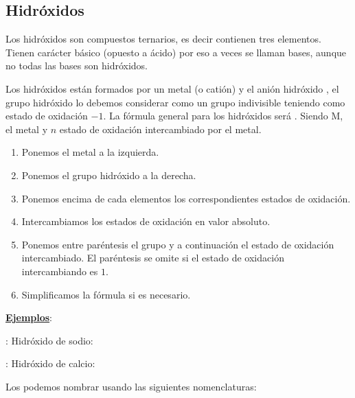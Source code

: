 \documentclass[12pt]{article}
\begin{document}
\subsection{Hidróxidos}

Los hidróxidos son compuestos ternarios, es decir contienen tres elementos. Tienen carácter básico (opuesto a ácido) por eso a veces se llaman bases, aunque no todas las bases son hidróxidos.

Los hidróxidos están formados por un metal (o catión) y el anión hidróxido , el grupo hidróxido lo debemos considerar como un grupo indivisible teniendo como estado de oxidación $-1$. La fórmula general para los hidróxidos será . Siendo M, el metal y $n$ estado de oxidación intercambiado por el metal.

\vspace*{2mm}

\begin{enumerate}[label=\itembolascolor{\arabic*}{mygreen}]
    \item Ponemos el metal a la izquierda.
    \item Ponemos el grupo hidróxido  a la derecha.
    \item Ponemos encima de cada elementos los correspondientes estados de oxidación.
    \item Intercambiamos los estados de oxidación en valor absoluto.
    \item Ponemos entre paréntesis el grupo  y a continuación el estado de oxidación intercambiado. El paréntesis se omite si el estado de oxidación intercambiando es $1$.
    \item Simplificamos la fórmula si es necesario.
\end{enumerate}

\textbf{\uline{Ejemplos}}:

: Hidróxido de sodio:   \ch{->} 

: Hidróxido de calcio:   \ch{->} 

\vspace*{2mm}

Los podemos nombrar usando las siguientes nomenclaturas:
\end{document}
